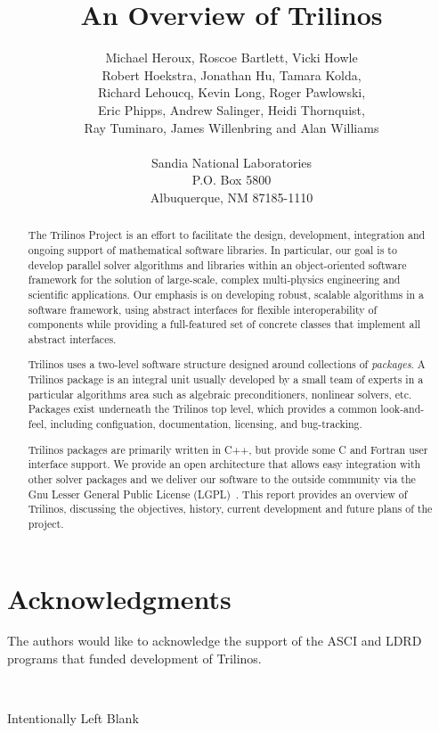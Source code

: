 \documentclass[12pt,relax]{TrilinosOverview}
\title{An Overview of Trilinos}
\author{Michael Heroux, Roscoe Bartlett, Vicki Howle \\
Robert Hoekstra, Jonathan Hu, Tamara Kolda, \\
Richard Lehoucq, Kevin Long, Roger Pawlowski, \\
Eric Phipps, Andrew Salinger, Heidi Thornquist, \\
Ray Tuminaro, James Willenbring and Alan Williams \\
 \\
Sandia National Laboratories \\
P.O. Box 5800 \\
Albuquerque, NM 87185-1110
}
\date{}
\begin{document}
\maketitle

\begin{abstract}
The Trilinos Project is an effort to facilitate the design,
development, integration and ongoing support of mathematical software
libraries.  In particular, our goal is to develop parallel solver 
algorithms and libraries within 
an object-oriented software framework for the solution of large-scale, complex
multi-physics engineering and scientific applications.   Our emphasis is on 
developing robust, scalable algorithms in a software framework, using abstract 
interfaces for flexible interoperability of components while providing a 
full-featured set of concrete classes that implement all abstract
interfaces.  

Trilinos uses a two-level software structure designed around
collections of
{\it packages}.  A Trilinos package is an integral unit usually
developed by a small team of experts in a particular algorithms area
such as algebraic preconditioners, nonlinear solvers, etc.  
Packages exist underneath
the Trilinos top level, which provides a common look-and-feel,
including configuation, documentation, licensing, and bug-tracking.

Trilinos packages are primarily written in C++, but provide some C and 
Fortran user interface support.  We provide an open architecture that allows 
easy integration with other solver packages and we deliver our software to 
the outside community via the Gnu Lesser General Public License
(LGPL)~\cite{gnu-license-site}.
This report provides an overview of Trilinos, discussing the 
objectives, history, current development and future plans of the project.
\end{abstract}


\clearpage
\section*{Acknowledgments}
The authors would like to acknowledge the support of the ASCI and LDRD programs
that funded development of Trilinos.

\newpage
\
\vspace{3.5in}
\begin{center}Intentionally Left Blank\end{center}
\clearpage
\tableofcontents
\listoffigures

\clearpage
{}
\end{document}
